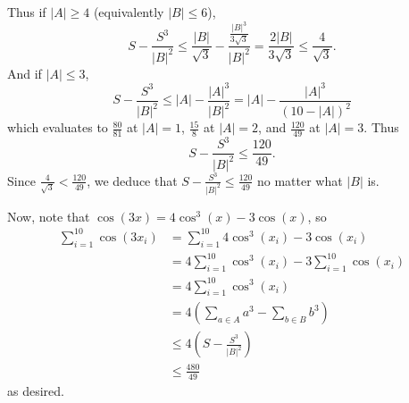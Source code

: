 Thus if $\left|A\right|\geq4$ (equivalently $\left|B\right|\leq6$), \[S-\frac{S^3}{\left|B\right|^2}\leq\frac{\left|B\right|}{\sqrt{3}}-\frac{\frac{\left|B\right|^3}{3\sqrt{3}}}{\left|B\right|^2}=\frac{2\left|B\right|}{3\sqrt{3}}\leq\frac{4}{\sqrt{3}}.\] And if $\left|A\right|\leq3$, \[S-\frac{S^3}{\left|B\right|^2}\leq\left|A\right|-\frac{\left|A\right|^3}{\left|B\right|^2}=\left|A\right|-\frac{\left|A\right|^3}{\left(10-\left|A\right|\right)^2}\] which evaluates to $\frac{80}{81}$ at $\left|A\right|=1$, $\frac{15}{8}$ at $\left|A\right|=2$, and $\frac{120}{49}$ at $\left|A\right|=3$. Thus \[S-\frac{S^3}{\left|B\right|^2}\leq\frac{120}{49}.\] Since $\frac{4}{\sqrt{3}}<\frac{120}{49}$, we deduce that $S-\frac{S^3}{\left|B\right|^2}\leq\frac{120}{49}$ no matter what $\left|B\right|$ is.

Now, note that $\cos\left(3x\right)=4\cos^3\left(x\right)-3\cos\left(x\right)$, so
\begin{align*}
	\displaystyle\sum_{i=1}^{10}\cos\left(3x_i\right)&=\displaystyle\sum_{i=1}^{10}4\cos^3\left(x_i\right)-3\cos\left(x_i\right)\\
	&=4\displaystyle\sum_{i=1}^{10}\cos^3\left(x_i\right)-3\displaystyle\sum_{i=1}^{10}\cos\left(x_i\right)\\
	&=4\displaystyle\sum_{i=1}^{10}\cos^3\left(x_i\right)\\
	&=4\left(\displaystyle\sum_{a\in A}a^3-\displaystyle\sum_{b\in B}b^3\right)\\
	&\leq4\left(S-\frac{S^3}{\left|B\right|^2}\right)\\
	&\leq\frac{480}{49}
\end{align*}
as desired.